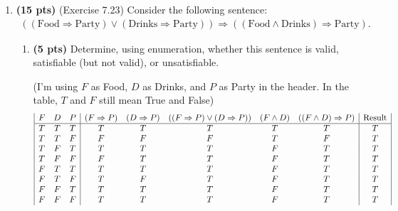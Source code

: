 \documentclass{article}
\begin{document}
\begin{enumerate}
\begin{enumerate}[label=($\alph*$)]
    
    \end{enumerate}



\item \textbf{(15 pts)} (Exercise 7.23) Consider the following sentence:
\begin{gather*}
    ((\text{Food} \Rightarrow \text{Party}) \vee (\text{Drinks} \Rightarrow \text{Party})) \Rightarrow ((\text{Food} \wedge \text{Drinks}) \Rightarrow \text{Party}).
\end{gather*}

    \begin{enumerate}[label=($\alph*$)]


    \item \textbf{(5 pts)} Determine, using enumeration, whether this sentence is valid, satisfiable (but not valid), or unsatisfiable.

    \color{blue}
        (I'm using $F$ as Food, $D$ as Drinks, and $P$ as Party in the header. In the table, $T$ and $F$ still mean True and False)
        \begin{displaymath}
        \begin{array}{|c c c|c c c c c|c|}
            F & D & P & (F \Rightarrow P) & (D \Rightarrow P) & ((F \Rightarrow P) \vee (D \Rightarrow P)) & (F \wedge D) & ((F \wedge D) \Rightarrow P) & \text{Result}\\
            \hline
            T & T & T & T & T & T & T & T & T\\
            T & T & F & F & F & F & T & F & T\\
            T & F & T & T & T & T & F & T & T\\
            T & F & F & F & T & T & F & T & T\\
            F & T & T & T & T & T & F & T & T\\
            F & T & F & T & F & T & F & T & T\\
            F & F & T & T & T & T & F & T & T\\
            F & F & F & T & T & T & F & T & T
        \end{array}
        \end{displaymath}


\end{enumerate}
\end{enumerate}
\end{document}
